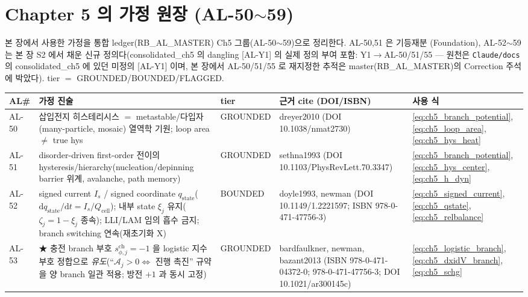 \documentclass[11pt,a4paper]{article}
\newcommand{\dd}{\mathrm{d}}
\newcommand{\cell}{\mathrm{cell}}
\newcommand{\chg}{\mathrm{ch}}
\newcommand{\stt}{\mathrm{state}}
\newcommand{\AL}[1]{\textsf{[AL-#1]}}
\newcommand{\brk}{\discretionary{}{}{}}%
\begin{document}
\section{Chapter 5 의 가정 원장 (AL-50$\sim$59)}\label{sec:ch5_al}
본 장에서 사용한 가정을 통합 ledger(RB\_AL\_MASTER) Ch5 그룹(AL-50$\sim$59)으로 정리한다. AL-50,51 은 기등재분
(Foundation), AL-52$\sim$59 는 본 장 S2 에서 채운 신규 정의다(consolidated\_ch5 의 dangling \AL{Y1} 의 실제
정의 부여 포함: Y1$\to$AL-50/51/55 — 원천은 \texttt{Claude/docs} 의 consolidated\_ch5 에 있던 미정의 \AL{Y1}
이며, 본 장에서 AL-50/51/55 로 재지정한 추적은 master(RB\_AL\_MASTER)의 Correction 주석에 박았다). tier $=$
GROUNDED/BOUNDED/FLAGGED.
{\footnotesize
\setlength{\tabcolsep}{3pt}
\sloppy
\begin{longtable}{>{\raggedright\arraybackslash}p{} >{\raggedright\arraybackslash}p{} >{\raggedright\arraybackslash}p{} >{\raggedright\arraybackslash}p{} >{\raggedright\arraybackslash}p{}}
\toprule AL\# & 가정 진술 & tier & 근거 cite (DOI/ISBN) & 사용 식 \\ \midrule \endhead
AL-50 & 삽입전지 히스테리시스 $=$ metastable/다입자(many-particle, mosaic) 열역학 기원; loop area $\ne$ true hys & GROUNDED & dreyer2010 (DOI 10.1038/\brk nmat2730) & \eqref{eq:ch5_branch_potential},\allowbreak\eqref{eq:ch5_loop_area},\allowbreak\eqref{eq:ch5_hys_heat} \\
AL-51 & disorder-driven first-order 전이의 hysteresis/hierarchy(nucleation/depinning barrier 위계, avalanche, path memory) & GROUNDED & sethna1993 (DOI 10.1103/\brk PhysRevLett.70.3347) & \eqref{eq:ch5_branch_potential},\allowbreak\eqref{eq:ch5_hys_center},\allowbreak\eqref{eq:ch5_h_dyn} \\
AL-52 & signed current $I_s$ / signed coordinate $q_\stt$($\dd q_\stt/\dd t{=}I_s/Q_\cell$); 내부 state $\xi_j$ 유지($\zeta_j{=}1{-}\xi_j$ 종속); LLI/LAM 임의 흡수 금지; branch switching 연속(재초기화 X) & BOUNDED & doyle1993, newman (DOI 10.1149/\brk 1.2221597; ISBN 978-0-\brk 471-47756-3) & \eqref{eq:ch5_signed_current},\allowbreak\eqref{eq:ch5_qstate},\allowbreak\eqref{eq:ch5_relbalance} \\
AL-53 & ★ 충전 branch 부호 $s_{\phi,j}^\chg{=}-1$ 을 logistic 지수 부호 정합으로 \emph{유도}(``$\mathcal A_j{>}0\Leftrightarrow$ 진행 촉진'' 규약을 양 branch 일관 적용; 방전 $+1$ 과 동시 고정) & GROUNDED & bardfaulkner, newman, bazant2013 (ISBN 978-0-\brk 471-04372-0; 978-0-\brk 471-47756-3; DOI 10.1021/\brk ar300145c) & \eqref{eq:ch5_logistic_branch},\allowbreak\eqref{eq:ch5_dxidV_branch},\allowbreak\eqref{eq:ch5_schg} \\

\end{longtable}}
\end{document}
